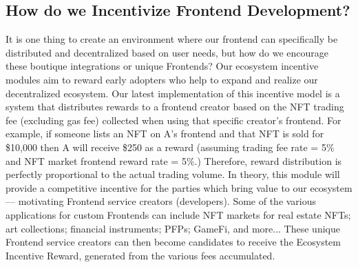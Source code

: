 \documentclass[dvipdfmx]{jsarticle}
\begin{document}
\subsection{How do we Incentivize Frontend Development?}
It is one thing to create an environment where our frontend can specifically be distributed and decentralized based on user needs, but how do we encourage these boutique integrations or unique Frontends? 
Our ecosystem incentive modules aim to reward early adopters who help to expand and realize our decentralized ecosystem.
Our latest implementation of this incentive model is a system that distributes rewards to a frontend creator based on the NFT trading fee (excluding gas fee) collected when using that specific creator’s frontend. 
For example, if someone lists an NFT on A’s frontend and that NFT is sold for \$10,000 then A will receive \$250 as a reward (assuming trading fee rate = 5\% and NFT market frontend reward rate = 5\%.) 
Therefore, reward distribution is perfectly proportional to the actual trading volume.
In theory, this module will provide a competitive incentive for the parties which bring value to our ecosystem — motivating Frontend service creators (developers). 
Some of the various applications for custom Frontends can include NFT markets for real estate NFTs; art collections; financial instruments; PFPs; GameFi, and more... 
These unique Frontend service creators can then become candidates to receive the Ecosystem Incentive Reward, generated from the various fees accumulated.
\end{document}
